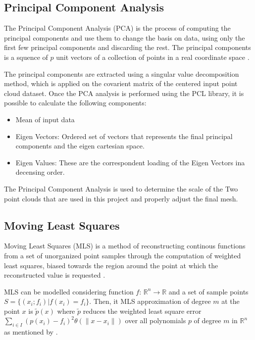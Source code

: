 \documentclass[12pt]{report}
\begin{document}
\subsection{Principal Component Analysis}
\label{section:Principal Component Analysis}
The Principal Component Analysis (PCA) is the process of computing the principal components and use them to change the basis on data, using only the first few principal components
and discarding the rest. The principal components is a squence of $p$ unit vectors of a collection of points in a real coordinate space .

The principal components are extracted using a singular value decomposition method, which is applied on the covarient matrix of the centered input point cloud dataset.
Once the PCA analysis is performed using the PCL library, it is possible to calculate the following components:
\begin{itemize}
  \item Mean of input data
  \item Eigen Vectors: Ordered set of vectors that represents the final principal components and the eigen cartesian space.
  \item Eigen Values: These are the correspondent loading of the Eigen Vectors ina decensing order.
\end{itemize}

The Principal Component Analysis is used to determine the scale of the Two point clouds that are used in this project and properly adjust the final mesh.

\subsection{Moving Least Squares}
\label{section:Moving Least Squares}

Moving Least Squares (MLS) is a method of reconstructing continous functions from a set of unorganized point samples through the computation of weighted least squares, 
biased towards the region around the point at which the reconstructed value is requested .

MLS can be modelled considering function $f$: $\mathbb{R}^n \rightarrow \mathbb{R}$ and a set of sample points $S = \{ ( x_i ; f_i ) | f(x_i) = f_i\} $.
Then, it MLS approximation of degree $m$ at the point $x$ is $\tilde{p} (x)$ where $\tilde{p}$ reduces the weighted least square error
$\sum_{i \in I} (p(x_i)-f_i)^2 \theta (\| x-x_i\| )$ over all polynomials $p$ of degree $m$ in $\mathbb{R}^n$ as mentioned by .
\end{document}
